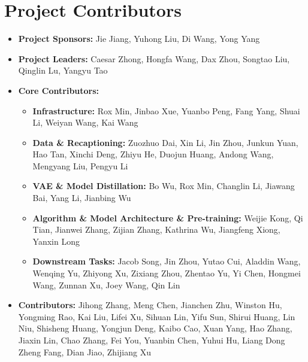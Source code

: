 \newpage
\section*{Project Contributors}

\begin{itemize}


  \item \textbf{Project Sponsors:} Jie Jiang, Yuhong Liu, Di Wang, Yong Yang 
    \item \textbf{Project Leaders:} Caesar Zhong, Hongfa Wang, Dax Zhou, Songtao Liu, Qinglin Lu, Yangyu Tao
    \item \textbf{Core Contributors:}
    \begin{itemize}
        \item \textbf{Infrastructure:} Rox Min, Jinbao Xue, Yuanbo Peng, Fang Yang, Shuai Li, Weiyan Wang, Kai Wang
        \item \textbf{Data \& Recaptioning:} Zuozhuo Dai, Xin Li, Jin Zhou, Junkun Yuan, Hao Tan, Xinchi Deng, Zhiyu He, Duojun Huang, Andong Wang, Mengyang Liu, Pengyu Li
        \item \textbf{VAE \& Model Distillation:} Bo Wu, Rox Min, Changlin Li, Jiawang Bai, Yang Li, Jianbing Wu 
        \item \textbf{Algorithm \& Model Architecture \& Pre-training:} Weijie Kong, Qi Tian, Jianwei Zhang, Zijian Zhang, Kathrina Wu, Jiangfeng Xiong, Yanxin Long
        \item \textbf{Downstream Tasks:} Jacob Song, Jin Zhou, Yutao Cui, Aladdin Wang, Wenqing Yu, Zhiyong Xu, Zixiang Zhou, Zhentao Yu, Yi Chen, Hongmei Wang, Zunnan Xu, Joey Wang, Qin Lin
    \end{itemize}
    \item \textbf{Contributors:} Jihong Zhang, Meng Chen, Jianchen Zhu, Winston Hu, Yongming Rao, Kai Liu, Lifei Xu, Sihuan Lin, Yifu Sun, Shirui Huang, Lin Niu, Shisheng Huang, Yongjun Deng, Kaibo Cao, Xuan Yang, Hao Zhang, Jiaxin Lin, Chao Zhang,  Fei You, Yuanbin Chen, Yuhui Hu, Liang Dong Zheng Fang, Dian Jiao, Zhijiang Xu
\end{itemize}

